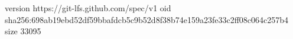 version https://git-lfs.github.com/spec/v1
oid sha256:698ab19ebd52df59bbafdcb5c9b52d8f38b74e159a23fe33c2ff08c064c257b4
size 33095
